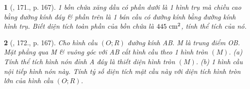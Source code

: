 \documentclass{article}
\newtheorem{baitoan}{}
\begin{document}
\begin{baitoan}[\cite{Tuyen_Toan_9_old}, 171., p. 167]
	1 bồn chứa xăng dầu có phần dưới là 1 hình trụ mà chiều cao bằng đường kính đáy \& phần trên là 1 bán cầu có đường kính bằng đường kính hình trụ. Biết diện tích toàn phần của bồn chứa là $445\ {\rm cm}^2$, tính thể tích của nó.
\end{baitoan}

\begin{baitoan}[\cite{Tuyen_Toan_9_old}, 172., p. 167]
	Cho hình cầu $(O;R)$ đường kính AB. M là trung điểm OB. Mặt phẳng qua M \& vuông góc với AB cắt hình cầu theo 1 hình tròn $(M)$. (a) Tính thể tích hình nón đỉnh A đáy là thiết diện hình tròn $(M)$. (b) 1 hình cầu nội tiếp hình nón này. Tính tỷ số diện tích mặt cầu này với diện tích hình tròn lớn của hình cầu $(O;R)$.
\end{baitoan}


\printbibliography[heading=bibintoc]
	
\end{document}
